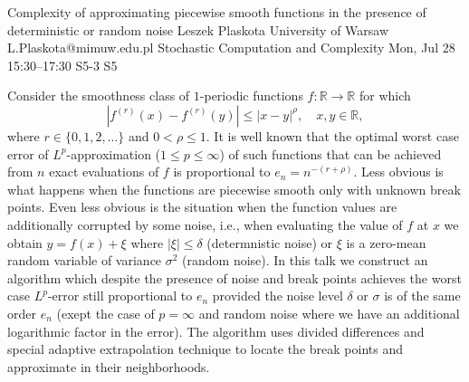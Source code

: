 \begin{talk}
  {Complexity of approximating piecewise smooth functions in the presence of deterministic or random noise}%
  {Leszek Plaskota}%
  {University of Warsaw}%
  {L.Plaskota@mimuw.edu.pl}%
  {Stochastic Computation and Complexity}%
  {}%
  {Mon, Jul 28 15:30–17:30}%
  {S5-3}%
  {S5}%
				
			
Consider the smoothness class of $1$-periodic functions $f:\mathbb R\to\mathbb R$ for which 
$$|f^{(r)}(x)-f^{(r)}(y)|\le |x-y|^\rho,\quad x,y\in\mathbb R,$$ 
where $r\in\{0,1,2,\ldots\}$ and $0<\rho\le 1.$ It is well known that the optimal worst case error of $L^p$-approximation ($1\le p\le\infty$) of such functions that can be achieved from $n$ exact evaluations of $f$ is proportional to $e_n=n^{-(r+\rho)}.$ Less obvious is what happens when the functions are piecewise smooth only with unknown break points. Even less obvious is the situation when the function values are additionally corrupted by some noise, i.e., when evaluating the value of $f$ at $x$ we obtain $y=f(x)+\xi$ where $|\xi|\le\delta$ (determnistic noise) or $\xi$ is a zero-mean random variable of variance $\sigma^2$ (random noise). In this talk we construct an algorithm which despite the presence of noise and break points achieves the worst case $L^p$-error still proportional to $e_n$ provided the noise level $\delta$ or $\sigma$ is of the same order $e_n$ (exept the case of $p=\infty$ and random noise where we have an additional logarithmic factor in the error). The algorithm uses divided differences and special adaptive extrapolation technique to locate the break points and approximate in their neighborhoods. 

\end{talk}


